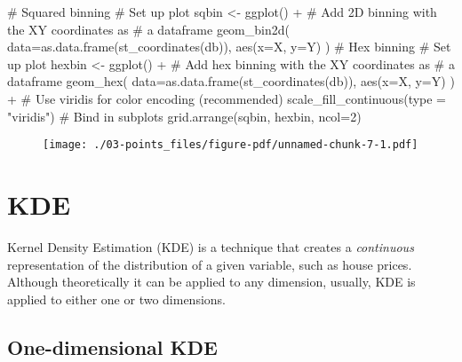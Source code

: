 \documentclass[
  letterpaper,
  krantz2]{style/krantz}
\newenvironment{Shaded}{\begin{snugshade}}{\end{snugshade}}
\newcommand{\AttributeTok}[1]{\textcolor[rgb]{0.40,0.45,0.13}{#1}}
\newcommand{\CommentTok}[1]{\textcolor[rgb]{0.37,0.37,0.37}{#1}}
\newcommand{\DecValTok}[1]{\textcolor[rgb]{0.68,0.00,0.00}{#1}}
\newcommand{\FunctionTok}[1]{\textcolor[rgb]{0.28,0.35,0.67}{#1}}
\newcommand{\NormalTok}[1]{\textcolor[rgb]{0.00,0.23,0.31}{#1}}
\newcommand{\OtherTok}[1]{\textcolor[rgb]{0.00,0.23,0.31}{#1}}
\newcommand{\SpecialCharTok}[1]{\textcolor[rgb]{0.37,0.37,0.37}{#1}}
\newcommand{\StringTok}[1]{\textcolor[rgb]{0.13,0.47,0.30}{#1}}
\begin{document}
\begin{Shaded}
\begin{Highlighting}[]
      \CommentTok{\# Squared binning}
\CommentTok{\# Set up plot}
\NormalTok{sqbin }\OtherTok{\textless{}{-}} \FunctionTok{ggplot}\NormalTok{() }\SpecialCharTok{+} 
\CommentTok{\# Add 2D binning with the XY coordinates as}
\CommentTok{\# a dataframe}
  \FunctionTok{geom\_bin2d}\NormalTok{(}
    \AttributeTok{data=}\FunctionTok{as.data.frame}\NormalTok{(}\FunctionTok{st\_coordinates}\NormalTok{(db)), }
    \FunctionTok{aes}\NormalTok{(}\AttributeTok{x=}\NormalTok{X, }\AttributeTok{y=}\NormalTok{Y)}
\NormalTok{  )}
      \CommentTok{\# Hex binning}
\CommentTok{\# Set up plot}
\NormalTok{hexbin }\OtherTok{\textless{}{-}} \FunctionTok{ggplot}\NormalTok{() }\SpecialCharTok{+}
\CommentTok{\# Add hex binning with the XY coordinates as}
\CommentTok{\# a dataframe }
  \FunctionTok{geom\_hex}\NormalTok{(}
    \AttributeTok{data=}\FunctionTok{as.data.frame}\NormalTok{(}\FunctionTok{st\_coordinates}\NormalTok{(db)),}
    \FunctionTok{aes}\NormalTok{(}\AttributeTok{x=}\NormalTok{X, }\AttributeTok{y=}\NormalTok{Y)}
\NormalTok{  ) }\SpecialCharTok{+}
\CommentTok{\# Use viridis for color encoding (recommended)}
  \FunctionTok{scale\_fill\_continuous}\NormalTok{(}\AttributeTok{type =} \StringTok{"viridis"}\NormalTok{)}
      \CommentTok{\# Bind in subplots}
\FunctionTok{grid.arrange}\NormalTok{(sqbin, hexbin, }\AttributeTok{ncol=}\DecValTok{2}\NormalTok{)}
\end{Highlighting}
\end{Shaded}

\begin{figure}[H]

{\centering \texttt{[image: ./03-points\_files/figure-pdf/unnamed-chunk-7-1.pdf]}

}

\end{figure}

\hypertarget{kde}{%
\section{KDE}\label{kde}}

Kernel Density Estimation (KDE) is a technique that creates a
\emph{continuous} representation of the distribution of a given
variable, such as house prices. Although theoretically it can be applied
to any dimension, usually, KDE is applied to either one or two
dimensions.

\hypertarget{one-dimensional-kde}{%
\subsection{One-dimensional KDE}\label{one-dimensional-kde}}
\end{document}
